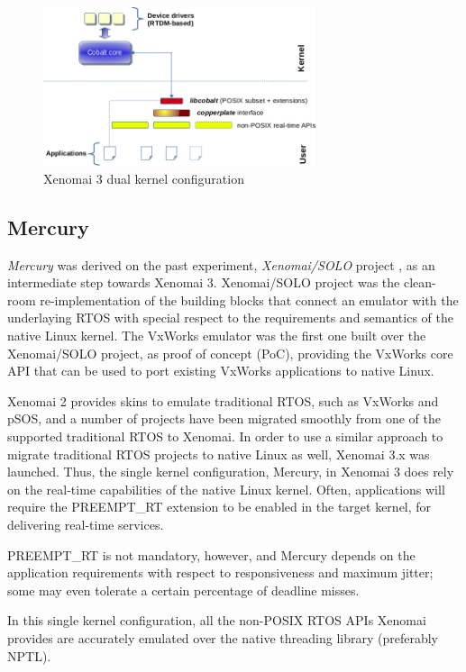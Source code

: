 \documentclass[10pt,a4paper]{article}
\begin{document}
\begin{multicols}{2}
\begin{figure}[H]
\begin{center}
\includegraphics[width=8cm]{img/x3-cobalt.png}
\caption{Xenomai 3 dual kernel configuration}
\label{xenomai3-coblat}
\end{center}
\end{figure}


\subsection{Mercury}

\textit{Mercury} was derived on the past experiment, \textit{Xenomai/SOLO} project \cite{xenomai-solo}, as an intermediate step towards Xenomai 3. Xenomai/SOLO project was the clean-room re-implementation of the building blocks that connect an emulator with the underlaying RTOS with special respect to the requirements and semantics of the native Linux kernel. The VxWorks emulator was the first one built over the Xenomai/SOLO project, as proof of concept (PoC), providing the VxWorks core API that can be used to port existing VxWorks applications to native Linux.

Xenomai 2 provides skins to emulate traditional RTOS, such as VxWorks and pSOS, and a number of projects have been migrated smoothly from one of the supported traditional RTOS to Xenomai. In order to use a similar approach to migrate traditional RTOS projects to native Linux as well, Xenomai 3.x was launched. Thus, the single kernel configuration, Mercury, in Xenomai 3 does rely on the real-time capabilities of the native Linux kernel. Often, applications will require the PREEMPT\_RT extension to be enabled in the target kernel, for delivering real-time services.

PREEMPT\_RT is not mandatory, however, and Mercury depends on the application requirements with respect to responsiveness and maximum jitter; some may even tolerate a certain percentage of deadline misses.

In this single kernel configuration, all the non-POSIX RTOS APIs Xenomai provides are accurately emulated over the native threading library (preferably NPTL).


\end{multicols}
\end{document}

